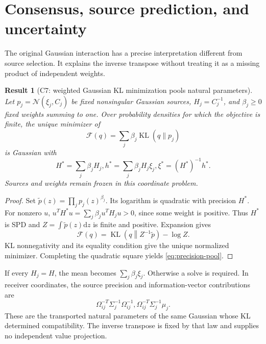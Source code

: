 \documentclass[11pt]{article}
\newtheorem{result}{Result}
\newcommand{\KL}{\operatorname{KL}}
\begin{document}
\section{Consensus, source prediction, and uncertainty}
\label{sec:uncertainty}
The original Gaussian interaction has a precise interpretation different from source selection. It explains the inverse transpose without treating it as a missing product of independent weights.

\begin{result}[C7: weighted Gaussian KL minimization pools natural parameters]
\label{res:C7}
Let $p_j=\mathcal N(\xi_j,C_j)$ be fixed nonsingular Gaussian sources, $H_j=C_j^{-1}$, and $\beta_j\geq0$ fixed weights summing to one. Over probability densities for which the objective is finite, the unique minimizer of
\begin{equation}
\mathcal F(q)=\sum_j\beta_j\KL(q\|p_j)
\label{eq:pool-objective}
\end{equation}
is Gaussian with
\begin{equation}
H^*=\sum_j\beta_jH_j, h^*=\sum_j\beta_jH_j\xi_j,
\xi^*=(H^*)^{-1}h^*.
\label{eq:precision-pool}
\end{equation}
Sources and weights remain frozen in this coordinate problem.
\end{result}
\begin{proof}
Set $\widetilde p(z)=\prod_jp_j(z)^{\beta_j}$. Its logarithm is quadratic with precision $H^*$. For nonzero $u$, $u^TH^*u=\sum_j\beta_ju^TH_ju>0$, since some weight is positive. Thus $H^*$ is SPD and $Z=\int\widetilde p(z)\mathrm{d}z$ is finite and positive. Expansion gives
\begin{equation}
\mathcal F(q)=\KL\left(q\middle\|Z^{-1}\widetilde p\right)-\log Z.
\end{equation}
KL nonnegativity and its equality condition give the unique normalized minimizer. Completing the quadratic square yields \eqref{eq:precision-pool}.
\end{proof}

If every $H_j=H$, the mean becomes $\sum_j\beta_j\xi_j$. Otherwise a solve is required. In receiver coordinates, the source precision and information-vector contributions are
\begin{equation}
\Omega_{ij}^{-T}\Sigma_j^{-1}\Omega_{ij}^{-1},
\Omega_{ij}^{-T}\Sigma_j^{-1}\mu_j.
\label{eq:local-messages}
\end{equation}
These are the transported natural parameters of the same Gaussian whose KL determined compatibility. The inverse transpose is fixed by that law and supplies no independent value projection.
\end{document}
